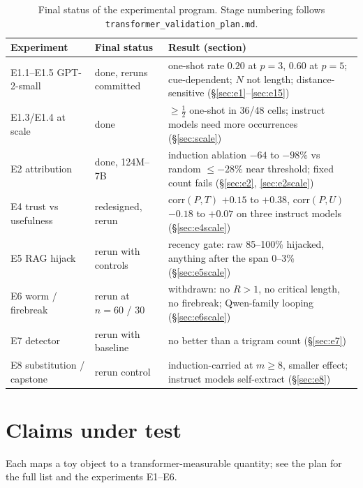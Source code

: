 \documentclass[11pt]{article}
\theoremstyle{plain}
\theoremstyle{definition}
\theoremstyle{remark}
\begin{document}
\begin{table}[h]
\centering\small
\begin{tabular}{llp{}}
\toprule
Experiment & Final status & Result (section) \\
\midrule
E1.1--E1.5 GPT-2-small & done, reruns committed & one-shot rate $0.20$ at $p{=}3$, $0.60$ at $p{=}5$; cue-dependent; $N$ not length; distance-sensitive (\S\ref{sec:e1}--\ref{sec:e15}) \\
E1.3/E1.4 at scale & done & $\ge\tfrac12$ one-shot in 36/48 cells; instruct models need more occurrences (\S\ref{sec:scale}) \\
E2 attribution & done, 124M--7B & induction ablation $-64$ to $-98\%$ vs random $\le -28\%$ near threshold; fixed count fails (\S\ref{sec:e2}, \ref{sec:e2scale}) \\
E4 trust vs usefulness & redesigned, rerun & $\mathrm{corr}(P,T)$ $+0.15$ to $+0.38$, $\mathrm{corr}(P,U)$ $-0.18$ to $+0.07$ on three instruct models (\S\ref{sec:e4scale}) \\
E5 RAG hijack & rerun with controls & recency gate: raw 85--100\% hijacked, anything after the span 0--3\% (\S\ref{sec:e5scale}) \\
E6 worm / firebreak & rerun at $n{=}60$ / $30$ & withdrawn: no $R>1$, no critical length, no firebreak; Qwen-family looping (\S\ref{sec:e6scale}) \\
E7 detector & rerun with baseline & no better than a trigram count (\S\ref{sec:e7}) \\
E8 substitution / capstone & rerun control & induction-carried at $m\ge8$, smaller effect; instruct models self-extract (\S\ref{sec:e8}) \\
\bottomrule
\end{tabular}
\caption{Final status of the experimental program. Stage numbering follows
\texttt{transformer\_validation\_plan.md}.}
\label{tab:status}
\end{table}

\section{Claims under test}\label{sec:claims}
Each maps a toy object to a transformer-measurable quantity; see the plan for the full
list and the experiments E1--E6.
\end{document}
